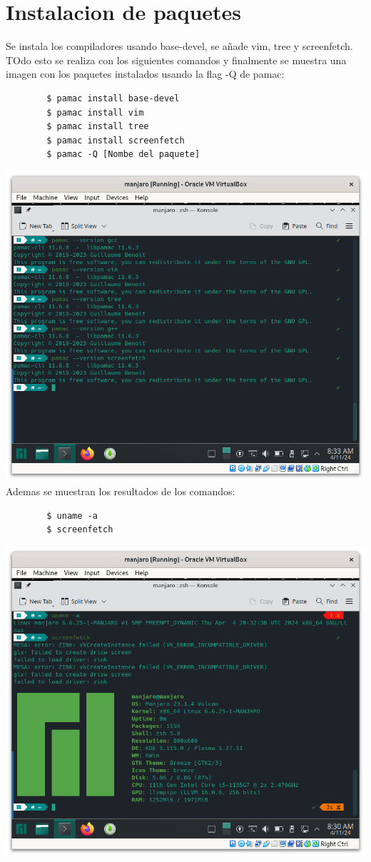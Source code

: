\documentclass{article}
\begin{document}
\newpage
\section{Instalacion de paquetes}
Se instala los compiladores usando base-devel, se añade vim, tree y screenfetch. TOdo esto se realiza con los siguientes comandos y finalmente se muestra una imagen con los paquetes instalados usando la flag -Q de pamac:
    
    \begin{verbatim}
        $ pamac install base-devel
        $ pamac install vim
        $ pamac install tree
        $ pamac install screenfetch
        $ pamac -Q [Nombe del paquete]
    \end{verbatim}

    \includegraphics[scale=0.5]{vm/paquetes.png}
\newpage
Ademas se muestran los resultados de los comandos:
    \begin{verbatim}
        $ uname -a
        $ screenfetch
    \end{verbatim}
    
    \includegraphics[scale=0.5]{vm/comandos.png}
\end{document}
